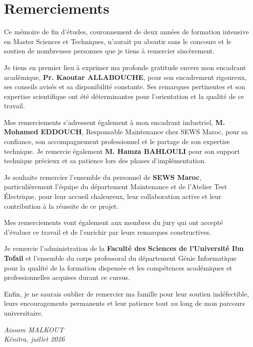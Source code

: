 ﻿%
\chapter*{Remerciements}

Ce mémoire de fin d'études, couronnement de deux années de formation intensive en Master Sciences et Techniques, n'aurait pu aboutir sans le concours et le soutien de nombreuses personnes que je tiens à remercier sincèrement.

Je tiens en premier lieu à exprimer ma profonde gratitude envers mon encadrant académique, \textbf{Pr. Kaoutar ALLABOUCHE}, pour son encadrement rigoureux, ses conseils avisés et sa disponibilité constante. Ses remarques pertinentes et son expertise scientifique ont été déterminantes pour l'orientation et la qualité de ce travail.

Mes remerciements s'adressent également à mon encadrant industriel, \textbf{M. Mohamed EDDOUCH}, Responsable Maintenance chez SEWS Maroc, pour sa confiance, son accompagnement professionnel et le partage de son expertise technique. Je remercie également \textbf{M. Hamza BAHLOULI} pour son support technique précieux et sa patience lors des phases d'implémentation.

Je souhaite remercier l'ensemble du personnel de \textbf{SEWS Maroc}, particulièrement l'équipe du département Maintenance et de l'Atelier Test Électrique, pour leur accueil chaleureux, leur collaboration active et leur contribution à la réussite de ce projet.

Mes remerciements vont également aux membres du jury qui ont accepté d'évaluer ce travail et de l'enrichir par leurs remarques constructives.

Je remercie l'administration de la \textbf{Faculté des Sciences de l'Université Ibn Tofail} et l'ensemble du corps professoral du département Génie Informatique pour la qualité de la formation dispensée et les compétences académiques et professionnelles acquises durant ce cursus.

Enfin, je ne saurais oublier de remercier ma famille pour leur soutien indéfectible, leurs encouragements permanents et leur patience tout au long de mon parcours universitaire.

\vspace{1cm}
\begin{flushright}
\textit{Aissam MALKOUT}\\
\textit{Kénitra, juillet 2026}
\end{flushright}
\clearpage
